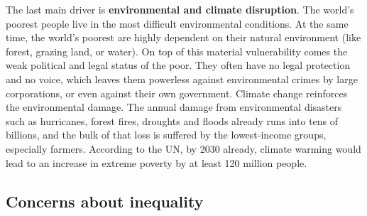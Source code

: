 \documentclass[../summary.tex]{subfiles}
\begin{document}
	The last main driver is \textbf{environmental and climate disruption}. The world's poorest people live in the most difficult environmental conditions. At the same time, the world’s poorest are highly dependent on their natural environment (like forest, grazing land, or water). On top of this material vulnerability comes the weak political and legal status of the poor. They often have no legal protection and no voice, which leaves them powerless against environmental crimes by large corporations, or even against their own government. Climate change reinforces the environmental damage. The annual damage from environmental disasters such as hurricanes, forest fires, droughts and floods already runs into tens of billions, and the bulk of that loss is suffered by the lowest-income groups, especially farmers. According to the UN, by 2030 already, climate warming would lead to an increase in extreme poverty by at least 120 million people.	
	\newpage
	\subsection{Concerns about inequality}
	
\end{document}
